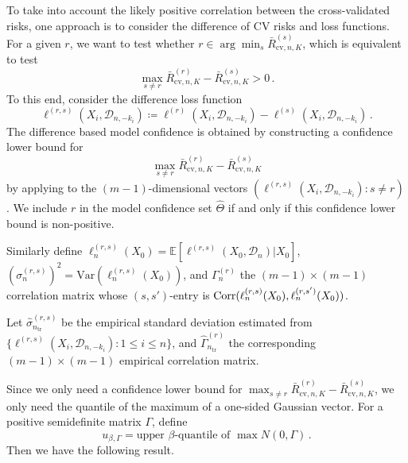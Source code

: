 \documentclass[11pt]{article}
\theoremstyle{plain}
\newcommand{\cv}{{\mathrm{cv}}}
\newcommand{\tr}{{\mathrm{tr}}}
\newcommand{\D}{{\mathcal{D}}}
\newcommand{\var}{\mathrm{Var}}
\begin{document}
To take into account the likely positive correlation between the cross-validated risks, one approach is to consider the difference of CV risks and loss functions. 
For a given $r$, we want to test whether $r\in\arg\min_s \bar R_{\cv,n,K}^{(s)}$, which is equivalent to test $$\max_{s\neq r} \bar R^{(r)}_{\cv,n,K}-\bar R^{(s)}_{\cv,n,K}>0\,.$$ To this end, consider the difference loss function
\begin{equation}
    \label{eq:5.1-diff-loss}
    \ell^{(r,s)}(X_i,\D_{n,-k_i})\coloneqq \ell^{(r)}(X_i,\D_{n,-k_i})-\ell^{(s)}(X_i,\D_{n,-k_i})\,.
\end{equation}
The difference based model confidence is obtained by constructing a confidence lower bound for $$\max_{s\neq r} \bar R_{\cv,n,K}^{(r)}-\bar R_{\cv,n,K}^{(s)}$$ by applying  to the $(m-1)$-dimensional vectors $(\ell^{(r,s)}(X_i,\D_{n,-k_i}):s\neq r)$.
We include $r$ in the model confidence set $\hat\Theta$ if and only if this confidence lower bound is non-positive.

Similarly define $\ell_n^{(r,s)}(X_0)=\mathbb E[\ell^{(r,s)}(X_0,\D_n)|X_0]$, $(\sigma_n^{(r,s)})^2=\var(\ell_n^{(r,s)}(X_0))$, and $\Gamma_n^{(r)}$ the $(m-1)\times (m-1)$ correlation matrix whose $(s,s')$-entry is ${\rm Corr}(\ell_n^{(r,s)}(X_0),\ell_n^{(r,s')}(X_0))$.

Let $\hat\sigma_{n_\tr}^{(r,s)}$ be the empirical standard deviation estimated from $\{\ell^{(r,s)}(X_i,\D_{n,-k_i}):1\le i\le n\}$, and $\hat\Gamma_{n_\tr}^{(r)}$ the corresponding $(m-1)\times (m-1)$ empirical correlation matrix.

Since we only need a confidence lower bound for $\max_{s\neq r} \bar R_{\cv,n,K}^{(r)}-\bar R_{\cv,n,K}^{(s)}$, we only need the quantile of the maximum of a one-sided Gaussian vector.  For a positive semidefinite matrix $\Gamma$, define
\begin{equation}
    \label{eq:5.1-gauss-quantile-one-side}
    u_{\beta,\Gamma} = \text{upper }\beta\text{-quantile of } \max N(0,\Gamma)\,.
\end{equation}
Then we have the following result.
\end{document}
